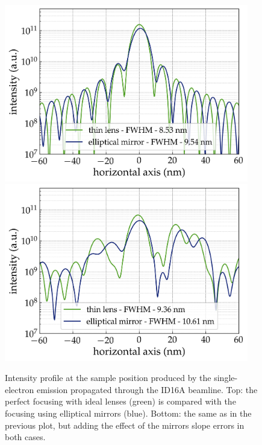 \documentclass{iucr}              %
\begin{document}
\begin{figure}
    \centering
        \includegraphics[width=0.95\textwidth]{GRAPHICS/filament_beam_ideal.png}
        \includegraphics[width=0.95\textwidth]{GRAPHICS/filament_beam_real.png}
    \label{fig:SingleElectron}
    \caption{Intensity profile at the sample position produced by the single-electron emission propagated through the ID16A beamline. Top: the perfect focusing with ideal lenses (green) is compared with the focusing using elliptical mirrors (blue). Bottom: the same as in the previous plot, but adding the effect of the mirrors slope errors in both cases.}
\end{figure}
\end{document}
